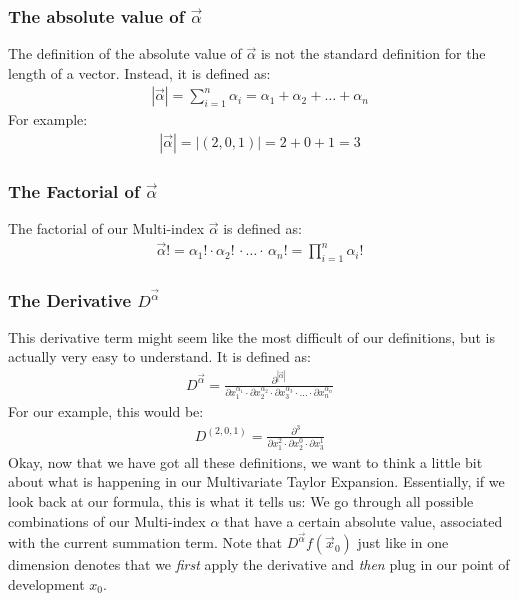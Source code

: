 \documentclass{article}
\begin{document}
	\subsubsection*{The absolute value of $\vec{\alpha}$}
	The definition of the absolute value of $\vec{\alpha}$ is not the standard definition for the length of a vector. Instead, it is defined as:
	\begin{align}
		|\vec{\alpha}| = \sum_{i=1}^n \alpha_i = \alpha_1+\alpha_2+\dots+\alpha_n
	\end{align}
	For example:
	\begin{align}
		|\vec{\alpha}|=|(2,0,1)| = 2+0+1 = 3
	\end{align}
	
	\subsubsection*{The Factorial of $\vec{\alpha}$}
	The factorial of our Multi-index $\vec{\alpha}$ is defined as:
	\begin{align}
		\vec{\alpha}! = \alpha_1!\cdot\alpha_2!\,\cdot\dots\cdot\,\alpha_n! = \prod_{i=1}^n \alpha_i!
	\end{align}
	
	\subsubsection*{The Derivative $D^{\vec{\alpha}}$}
	This derivative term might seem like the most difficult of our definitions, but is actually very easy to understand. It is defined as:
	\begin{align}
		D^{\vec{\alpha}}=\frac{\partial^{|\vec{\alpha}|}}{\partial x_1^{\alpha_1}\cdot \partial x_2^{\alpha_2}\cdot\partial x_3^{\alpha_3}\cdot\dots\cdot\partial x_n^{\alpha_n}}
	\end{align}
	For our example, this would be:
	\begin{align}
		D^{(2,0,1)}=\frac{\partial^3}{\partial x_1^2 \cdot \partial x_2^0 \cdot \partial x_3^1}
	\end{align}
	Okay, now that we have got all these definitions, we want to think a little bit about what is happening in our Multivariate Taylor Expansion.
	Essentially, if we look back at our formula, this is what it tells us:
	We go through all possible combinations of our Multi-index $\alpha$ that have a certain absolute value, associated with the current summation term. 
	Note that $D^{\vec{\alpha}}f(\vec{x}_0)$ just like in one dimension denotes that we \textit{first} apply the derivative and \textit{then} plug in our point of development $x_0$.
	
\end{document}
